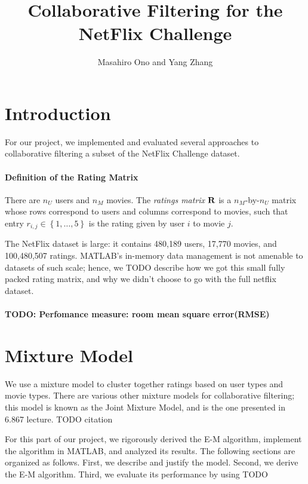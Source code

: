 \documentclass{article}
\title{Collaborative Filtering for the NetFlix Challenge}
\author{Masahiro Ono and Yang Zhang}
\newcommand{\mat}  [1]{{ \bf #1 }}
\newcommand{\range}[1]{{ \left\{ 1, \dots, #1 \right\} }}
\begin{document}
\maketitle

\section{Introduction}

For our project, we implemented and evaluated several approaches to
collaborative filtering a subset of the NetFlix Challenge dataset.

\paragraph{Definition of the Rating Matrix}
There are $n_U$ users and $n_M$ movies.  The {\em ratings matrix}
$\mat{R}$ is a $n_M$-by-$n_U$ matrix whose rows correspond to users
and columns correspond to movies, such that entry $r_{i,j} \in
\range{5}$ is the rating given by user $i$ to movie $j$.

The NetFlix dataset is large: it contains 480,189 users, 17,770
movies, and 100,480,507 ratings. MATLAB's in-memory data management is
not amenable to datasets of such scale; hence, we TODO describe how we
got this small fully packed rating matrix, and why we didn't choose to
go with the full netflix dataset.

\paragraph{TODO: Perfomance measure: room mean square error(RMSE)}

\section{Mixture Model}

We use a mixture model to cluster together ratings based on user types
and movie types. There are various other mixture models for
collaborative filtering; this model is known as the Joint Mixture
Model, and is the one presented in 6.867 lecture. TODO citation

For this part of our project, we rigorously derived the E-M algorithm,
implement the algorithm in MATLAB, and analyzed its results. The
following sections are organized as follows. First, we describe and
justify the model. Second, we derive the E-M algorithm. Third, we
evaluate its performance by using TODO 
\end{document}
